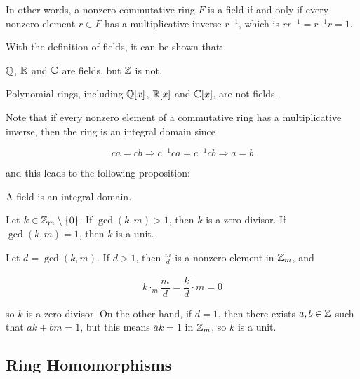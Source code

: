 \documentclass[a4paper,12pt]{article}
\begin{document}
In other words, a nonzero commutative ring $F$ is a field if and only if every nonzero element $r\in F$ has a multiplicative inverse $r^{-1}$, which is $rr^{-1}=r^{-1}r=1$.\n

\begin{exm}
  With the definition of fields, it can be shown that:

  \begin{alist}
    \item $\mathbb{Q}$, $\mathbb{R}$ and $\mathbb{C}$ are fields, but $\mathbb{Z}$ is not.
    \item Polynomial rings, including $\mathbb{Q}[x]$, $\mathbb{R}[x]$ and $\mathbb{C}[x]$, are not fields.
  \end{alist}
\end{exm}\n

Note that if every nonzero element of a commutative ring has a multiplicative inverse, then the ring is an integral domain since

$$ca=cb\Rightarrow c^{-1}ca=c^{-1}cb\Rightarrow a=b$$\s

and this leads to the following proposition:\n

\begin{pst}
  A field is an integral domain.
\end{pst}\n

\begin{pst}
  Let $k\in\mathbb{Z}_{m}\setminus\left\{ 0\right\}$. If $\gcd(k,m)>1$, then $k$ is a zero divisor. If $\gcd(k,m)=1$, then $k$ is a unit.\n

  \prf Let $d=\gcd(k,m)$. If $d>1$, then $\frac{m}{d}$ is a nonzero element in $\mathbb{Z}_{m}$, and

  $$k\cdot_{m}\frac{m}{d}=\overline{\frac{k}{d}\cdot m}=0$$\s

  so $k$ is a zero divisor. On the other hand, if $d=1$, then there exists $a,b\in\mathbb{Z}$ such that $ak+bm=1$, but this means $\overline{a}k=1$ in $\mathbb{Z}_{m}$, so $k$ is a unit.
\end{pst}


\subsection{Ring Homomorphisms}
\end{document}
